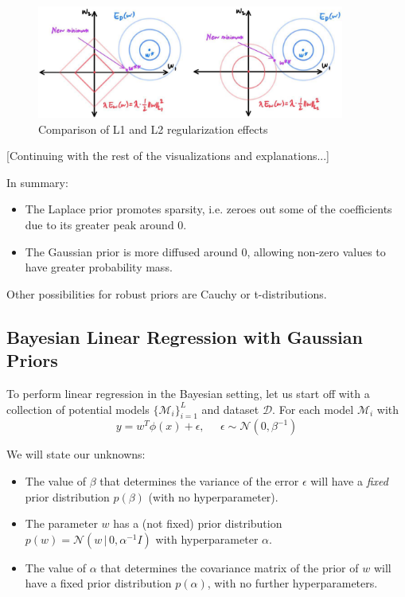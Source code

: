   \begin{figure}[H]
    \centering
    \includegraphics[width=0.9\textwidth]{img/L1vsL2.jpg}
    \caption{Comparison of L1 and L2 regularization effects}
  \end{figure}

  [Continuing with the rest of the visualizations and explanations...]

  In summary:
  \begin{itemize}
    \item The Laplace prior promotes sparsity, i.e. zeroes out some of the coefficients due to its greater peak around $0$.
    \item The Gaussian prior is more diffused around $0$, allowing non-zero values to have greater probability mass.
  \end{itemize}

  Other possibilities for robust priors are Cauchy or t-distributions.

\subsection{Bayesian Linear Regression with Gaussian Priors}

  To perform linear regression in the Bayesian setting, let us start off with a collection of potential models $\{\mathcal{M}_i\}_{i=1}^L$ and dataset $\mathcal{D}$. For each model $\mathcal{M}_i$ with
  \begin{equation}
    y = w^T \phi(x) + \epsilon, \;\;\;\;\; \epsilon \sim \mathcal{N}(0, \beta^{-1})
  \end{equation}

  We will state our unknowns:
  \begin{itemize}
    \item The value of $\beta$ that determines the variance of the error $\epsilon$ will have a \textit{fixed} prior distribution $p(\beta)$ (with no hyperparameter).
    \item The parameter $w$ has a (not fixed) prior distribution $p(w) = \mathcal{N}(w\,|\,0, \alpha^{-1} I)$ with hyperparameter $\alpha$.
    \item The value of $\alpha$ that determines the covariance matrix of the prior of $w$ will have a fixed prior distribution $p(\alpha)$, with no further hyperparameters.
  \end{itemize}

